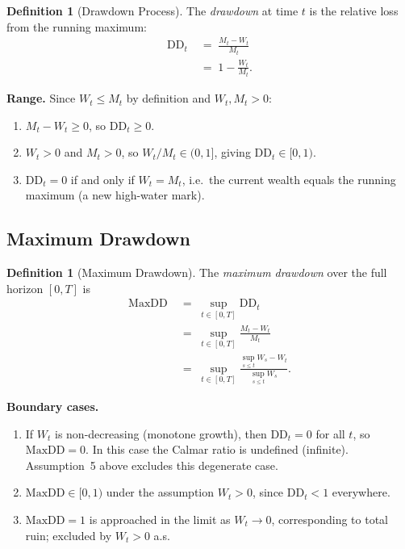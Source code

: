 \documentclass[12pt,openany]{book}
\newcommand{\DD}{\mathrm{DD}}
\newcommand{\MaxDD}{\mathrm{MaxDD}}
\numberwithin{equation}{chapter}
\theoremstyle{plain}
\theoremstyle{definition}
\newtheorem{definition}[theorem]{Definition}
\theoremstyle{remark}
\numberwithin{equation}{chapter}
\theoremstyle{plain}
\begin{document}
\begin{definition}[Drawdown Process]
\label{def:drawdown-process}
The \emph{drawdown} at time $t$ is the relative loss
from the running maximum:
\begin{align}
  \mathrm{DD}_t
    &\;=\; \frac{M_t - W_t}{M_t}
  \label{eq:dd-process1} \\
    &\;=\; 1 - \frac{W_t}{M_t}.
  \label{eq:dd-process2}
\end{align}

\noindent
\textbf{Range.}
Since $W_t \leq M_t$ by definition and $W_t, M_t > 0$:
\begin{enumerate}
  \item $M_t - W_t \geq 0$, so $\mathrm{DD}_t \geq 0$.
  \item $W_t > 0$ and $M_t > 0$, so
        $W_t/M_t \in (0,1]$, giving $\mathrm{DD}_t \in [0,1)$.
  \item $\mathrm{DD}_t = 0$ if and only if $W_t = M_t$, i.e.\
        the current wealth equals the running maximum
        (a new high-water mark).
\end{enumerate}
\end{definition}

\subsection{Maximum Drawdown}

\begin{definition}[Maximum Drawdown]
\label{def:maxdd}
The \emph{maximum drawdown} over the full horizon
$[0,T]$ is
\begin{align}
  \MaxDD
    &\;=\; \sup_{t \in [0,T]} \DD_t
  \label{eq:maxdd1} \\
    &\;=\; \sup_{t \in [0,T]}
           \frac{M_t - W_t}{M_t}
  \label{eq:maxdd2} \\
    &\;=\; \sup_{t \in [0,T]}
           \frac{\displaystyle\sup_{s \leq t} W_s - W_t}
                {\displaystyle\sup_{s \leq t} W_s}.
  \label{eq:maxdd3}
\end{align}

\noindent
\textbf{Boundary cases.}
\begin{enumerate}
  \item If $W_t$ is non-decreasing (monotone growth),
        then $\DD_t = 0$ for all $t$, so $\MaxDD = 0$.
        In this case the Calmar ratio is undefined
        (infinite).  Assumption~5 above excludes this
        degenerate case.
  \item $\MaxDD \in [0,1)$ under the assumption
        $W_t > 0$, since $\DD_t < 1$ everywhere.
  \item $\MaxDD = 1$ is approached in the limit as
        $W_t \to 0$, corresponding to total ruin;
        excluded by $W_t > 0$ a.s.
\end{enumerate}
\end{definition}
\end{document}
